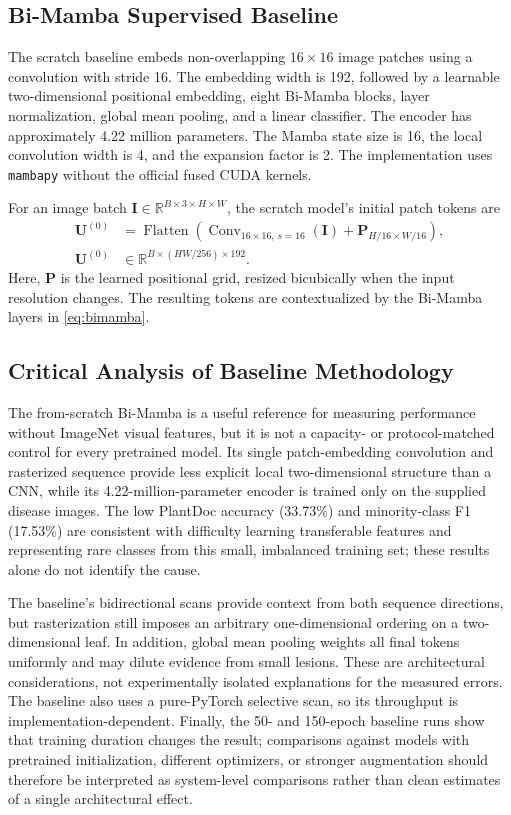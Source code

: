 \documentclass[conference]{IEEEtran}
\begin{document}
\subsection{Bi-Mamba Supervised Baseline}
The scratch baseline embeds non-overlapping $16\times16$ image patches using a convolution with stride 16. The embedding width is 192, followed by a learnable two-dimensional positional embedding, eight Bi-Mamba blocks, layer normalization, global mean pooling, and a linear classifier. The encoder has approximately 4.22 million parameters. The Mamba state size is 16, the local convolution width is 4, and the expansion factor is 2. The implementation uses \texttt{mambapy} without the official fused CUDA kernels.

For an image batch $\mathbf{I}\in\mathbb{R}^{B\times3\times H\times W}$, the scratch model's initial patch tokens are
\begin{equation}
    \begin{aligned}
    \mathbf{U}^{(0)} &= \operatorname{Flatten}\!\left(\operatorname{Conv}_{16\times16,\,s=16}(\mathbf{I})+\mathbf{P}_{H/16\times W/16}\right),\\
    \mathbf{U}^{(0)} &\in\mathbb{R}^{B\times(HW/256)\times192}.
    \end{aligned}
    \label{eq:patch-tokens}
\end{equation}
Here, $\mathbf{P}$ is the learned positional grid, resized bicubically when the input resolution changes. The resulting tokens are contextualized by the Bi-Mamba layers in \eqref{eq:bimamba}.

\subsection{Critical Analysis of Baseline Methodology}
The from-scratch Bi-Mamba is a useful reference for measuring performance without ImageNet visual features, but it is not a capacity- or protocol-matched control for every pretrained model. Its single patch-embedding convolution and rasterized sequence provide less explicit local two-dimensional structure than a CNN, while its 4.22-million-parameter encoder is trained only on the supplied disease images. The low PlantDoc accuracy (33.73\%) and minority-class F1 (17.53\%) are consistent with difficulty learning transferable features and representing rare classes from this small, imbalanced training set; these results alone do not identify the cause.

The baseline's bidirectional scans provide context from both sequence directions, but rasterization still imposes an arbitrary one-dimensional ordering on a two-dimensional leaf. In addition, global mean pooling weights all final tokens uniformly and may dilute evidence from small lesions. These are architectural considerations, not experimentally isolated explanations for the measured errors. The baseline also uses a pure-PyTorch selective scan, so its throughput is implementation-dependent. Finally, the 50- and 150-epoch baseline runs show that training duration changes the result; comparisons against models with pretrained initialization, different optimizers, or stronger augmentation should therefore be interpreted as system-level comparisons rather than clean estimates of a single architectural effect.
\end{document}
